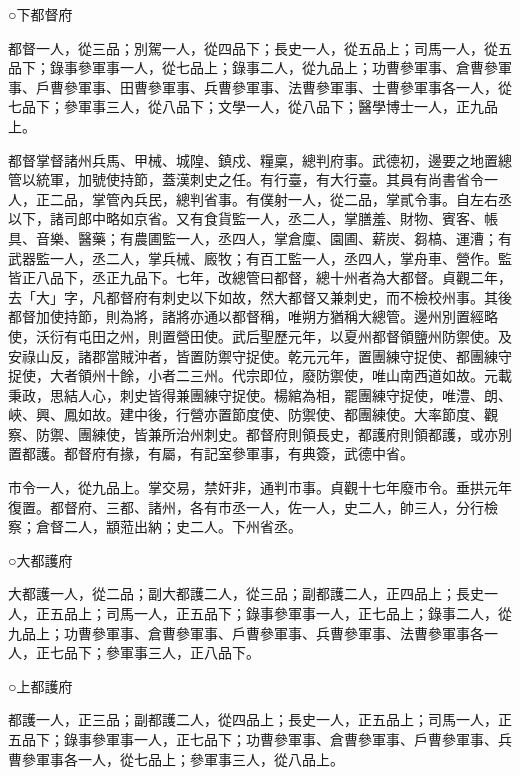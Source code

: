 \begin{pinyinscope}
 ○下都督府



 都督一人，從三品；別駕一人，從四品下；長史一人，從五品上；司馬一人，從五品下；錄事參軍事一人，從七品上；錄事二人，從九品上；功曹參軍事、倉曹參軍事、戶曹參軍事、田曹參軍事、兵曹參軍事、法曹參軍事、士曹參軍事各一人，從七品下；參軍事三人，從八品下；文學一人，從八品下；醫學博士一人，正九品上。



 都督掌督諸州兵馬、甲械、城隍、鎮戍、糧稟，總判府事。武德初，邊要之地置總管以統軍，加號使持節，蓋漢刺史之任。有行臺，有大行臺。其員有尚書省令一人，正二品，掌管內兵民，總判省事。有僕射一人，從二品，掌貳令事。自左右丞以下，諸司郎中略如京省。又有食貨監一人，丞二人，掌膳羞、財物、賓客、帳具、音樂、醫藥；有農圃監一人，丞四人，掌倉廩、園圃、薪炭、芻槁、運漕；有武器監一人，丞二人，掌兵械、廄牧；有百工監一人，丞四人，掌舟車、營作。監皆正八品下，丞正九品下。七年，改總管曰都督，總十州者為大都督。貞觀二年，去「大」字，凡都督府有刺史以下如故，然大都督又兼刺史，而不檢校州事。其後都督加使持節，則為將，諸將亦通以都督稱，唯朔方猶稱大總管。邊州別置經略使，沃衍有屯田之州，則置營田使。武后聖歷元年，以夏州都督領鹽州防禦使。及安祿山反，諸郡當賊沖者，皆置防禦守捉使。乾元元年，置團練守捉使、都團練守捉使，大者領州十餘，小者二三州。代宗即位，廢防禦使，唯山南西道如故。元載秉政，思結人心，刺史皆得兼團練守捉使。楊綰為相，罷團練守捉使，唯澧、朗、峽、興、鳳如故。建中後，行營亦置節度使、防禦使、都團練使。大率節度、觀察、防禦、團練使，皆兼所治州刺史。都督府則領長史，都護府則領都護，或亦別置都護。都督府有掾，有屬，有記室參軍事，有典簽，武德中省。



 市令一人，從九品上。掌交易，禁奸非，通判市事。貞觀十七年廢市令。垂拱元年復置。都督府、三都、諸州，各有市丞一人，佐一人，史二人，帥三人，分行檢察；倉督二人，顓蒞出納；史二人。下州省丞。



 ○大都護府



 大都護一人，從二品；副大都護二人，從三品；副都護二人，正四品上；長史一人，正五品上；司馬一人，正五品下；錄事參軍事一人，正七品上；錄事二人，從九品上；功曹參軍事、倉曹參軍事、戶曹參軍事、兵曹參軍事、法曹參軍事各一人，正七品下；參軍事三人，正八品下。



 ○上都護府



 都護一人，正三品；副都護二人，從四品上；長史一人，正五品上；司馬一人，正五品下；錄事參軍事一人，正七品下；功曹參軍事、倉曹參軍事、戶曹參軍事、兵曹參軍事各一人，從七品上；參軍事三人，從八品上。




\end{pinyinscope}
